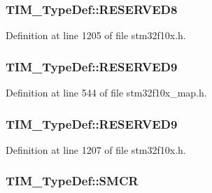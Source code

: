 \subsubsection[{\texorpdfstring{R\+E\+S\+E\+R\+V\+E\+D8}{RESERVED8}}]{ T\+I\+M\+\_\+\+Type\+Def\+::\+R\+E\+S\+E\+R\+V\+E\+D8}\hypertarget{struct_t_i_m___type_def_ac708e4f0f142ac14d7e1c46778ed6f96}{}\label{struct_t_i_m___type_def_ac708e4f0f142ac14d7e1c46778ed6f96}


Definition at line 1205 of file stm32f10x.\+h.

\subsubsection[{\texorpdfstring{R\+E\+S\+E\+R\+V\+E\+D9}{RESERVED9}}]{ T\+I\+M\+\_\+\+Type\+Def\+::\+R\+E\+S\+E\+R\+V\+E\+D9}\hypertarget{struct_t_i_m___type_def_ab5c06d89e2d7a93adceb073cac357e1d}{}\label{struct_t_i_m___type_def_ab5c06d89e2d7a93adceb073cac357e1d}


Definition at line 544 of file stm32f10x\+\_\+map.\+h.

\subsubsection[{\texorpdfstring{R\+E\+S\+E\+R\+V\+E\+D9}{RESERVED9}}]{ T\+I\+M\+\_\+\+Type\+Def\+::\+R\+E\+S\+E\+R\+V\+E\+D9}\hypertarget{struct_t_i_m___type_def_a6754dd714ff0885e8e511977d2f393ce}{}\label{struct_t_i_m___type_def_a6754dd714ff0885e8e511977d2f393ce}


Definition at line 1207 of file stm32f10x.\+h.

\subsubsection[{\texorpdfstring{S\+M\+CR}{SMCR}}]{ T\+I\+M\+\_\+\+Type\+Def\+::\+S\+M\+CR}\hypertarget{struct_t_i_m___type_def_a276915da29a7637178afc7aed189f2eb}{}\label{struct_t_i_m___type_def_a276915da29a7637178afc7aed189f2eb}


